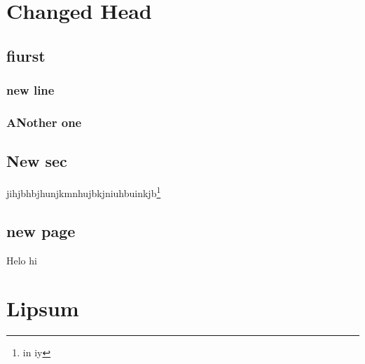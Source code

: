 \documentclass{book}
\begin{document}
\chapter[]{Changed Head}
\section[]{fiurst}
\subsection[]{new line}
\subsection[short]{ANother one}
\section[short]{New sec}
jihjbhbjhunjkmnhujbkjniuhbuinkjb\footnote{in iy}
\newpage
\section[short]{new page}
Helo hi
\newpage
\chapter[]{Lipsum}
\end{document}
